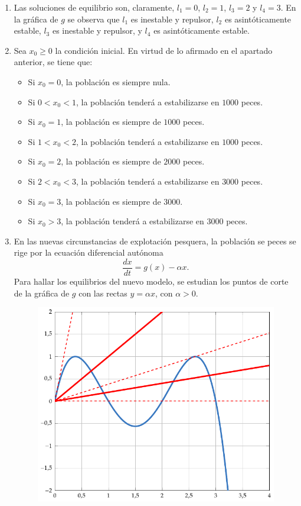 \documentclass[11pt]{report}
\begin{document}
\begin{solution}
    \hfill
    \begin{enumerate}
        \item Las soluciones de equilibrio son, claramente, $l_1 = 0$, $l_2 = 1$, $l_3 = 2$ y $l_4 = 3$. En la gráfica de $g$ se observa que $l_1$ es inestable y repulsor, $l_2$ es asintóticamente estable, $l_3$ es inestable y repulsor, y $l_4$ es asintóticamente estable.
        \item Sea $x_0 \geq 0$ la condición inicial. En virtud de lo afirmado en el apartado anterior, se tiene que:
        \begin{itemize}
            \item Si $x_0 = 0$, la población es siempre nula.
            \item Si $0 < x_0 < 1$, la población tenderá a estabilizarse en $1000$ peces.
            \item Si $x_0 = 1$, la población es siempre de $1000$ peces.
            \item Si $1 < x_0 < 2$, la población tenderá a estabilizarse en $1000$ peces.
            \item Si $x_0 = 2$, la población es siempre de $2000$ peces.
            \item Si $2 < x_0 < 3$, la población tenderá a estabilizarse en $3000$ peces.
            \item Si $x_0 = 3$, la población es siempre de $3000$.
            \item Si $x_0 > 3$, la población tenderá a estabilizarse en $3000$ peces.
        \end{itemize}
        \item En las nuevas circunstancias de explotación pesquera, la población se peces se rige por la ecuación diferencial autónoma
        \[\frac{dx}{dt} = g(x) - \alpha x.\]
        Para hallar los equilibrios del nuevo modelo, se estudian los puntos de corte de la gráfica de $g$ con las rectas $y = \alpha x$, con $\alpha > 0$.
        \begin{figure}[H]
            \centering
            \includegraphics[scale = 0.7]{plot3/main.pdf}

\end{figure}
\end{enumerate}
\end{solution}
\end{document}

